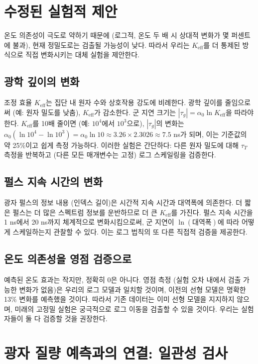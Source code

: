 \documentclass[12pt,a4paper]{article}
\newcommand{\Keff}{K_{\mathrm{eff}}}
\begin{document}
	\section{수정된 실험적 제안}
	
	온도 의존성이 극도로 약하기 때문에 (로그적, 온도 두 배 시 상대적 변화가 몇 퍼센트에 불과), 현재 정밀도로는 검출될 가능성이 낮다. 따라서 우리는 \(\Keff\)를 더 통제된 방식으로 직접 변화시키는 대체 실험을 제안한다.
	
	\subsection{광학 깊이의 변화}
	
	조정 효율 \(\Keff\)는 집단 내 원자 수와 상호작용 강도에 비례한다. 광학 깊이를 줄임으로써 (예: 원자 밀도를 낮춤), \(\Keff\)가 감소한다. 군 지연 크기는 \(|\tau_g| = \alpha_0 \ln\Keff\)을 따라야 한다. \(\Keff\)를 10배 줄이면 (예: \(10^4\)에서 \(10^3\)으로), \(|\tau_g|\)의 변화는 \(\alpha_0 (\ln 10^4 - \ln 10^3) = \alpha_0 \ln 10 \approx 3.26 \times 2.3026 \approx 7.5\) ns가 되며, 이는 기준값의 약 25\%이고 쉽게 측정 가능하다. 이러한 실험은 간단하다: 다른 원자 밀도에 대해 \(\tau_T\) 측정을 반복하고 (다른 모든 매개변수는 고정) 로그 스케일링을 검증한다.
	
	\subsection{펄스 지속 시간의 변화}
	
	광자 펄스의 정보 내용 (인덱스 길이)은 시간적 지속 시간과 대역폭에 의존한다. 더 짧은 펄스는 더 많은 스펙트럼 정보를 운반하므로 더 큰 \(\Keff\)를 가진다. 펄스 지속 시간을 1 ns에서 20 ns까지 체계적으로 변화시킴으로써, 군 지연이 \(\ln(\text{대역폭})\)에 따라 어떻게 스케일하는지 관찰할 수 있다. 이는 로그 법칙의 또 다른 직접적 검증을 제공한다.
	
	\subsection{온도 의존성을 영점 검증으로}
	
	예측된 온도 효과는 작지만, 정확히 0은 아니다. 영점 측정 (실험 오차 내에서 검출 가능한 변화가 없음)은 우리의 로그 모델과 일치할 것이며, 이전의 선형 모델은 명확한 13\% 변화를 예측했을 것이다. 따라서 기존 데이터는 이미 선형 모델을 지지하지 않으며, 미래의 고정밀 실험은 궁극적으로 로그 이동을 검출할 수 있을 것이다. 우리는 실험자들이 둘 다 검증할 것을 권장한다.
	
	\section{광자 질량 예측과의 연결: 일관성 검사}
	\label{sec:photon_mass_consistency}
	
\end{document}
